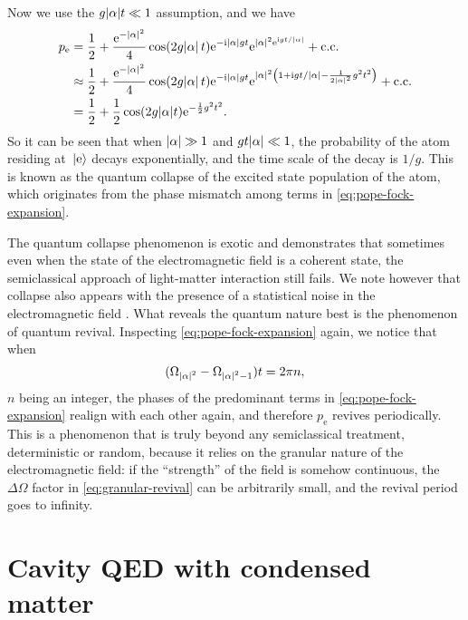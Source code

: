 \documentclass[hyperref, a4paper]{article}
\newcommand*{\ii}{\mathrm{i}}
\newcommand*{\ee}{\mathrm{e}}
\newcommand*{\kete}{\ket*{\text{e}}}
\newcommand*{\pope}{p_{\text{e}}}
\begin{document}
Now we use the $g \abs{\alpha} t \ll 1$ assumption, and we have 
\begin{equation}
    \begin{aligned}
        \pope &= \frac{1}{2} + \frac{\ee^{- \abs*{\alpha}^2}}{4} 
        \cos( 2 g \abs*{\alpha} t) \ee^{- \ii \abs{\alpha} g t} \ee^{\abs{\alpha}^2 \ee^{\ii g t / \abs{\alpha}}} + \text{c.c.} \\
        &\approx  \frac{1}{2} + \frac{\ee^{- \abs*{\alpha}^2}}{4} 
        \cos( 2 g \abs*{\alpha} t) \ee^{- \ii \abs{\alpha} g t} \ee^{\abs{\alpha}^2 \left(1 + \ii g t / \abs{\alpha} - \frac{1}{2 \abs{\alpha}^2} g^2 t^2  \right) } + \text{c.c.} \\
        &= \frac{1}{2} + \frac{1}{2} \cos (2 g \abs{\alpha} t) \ee^{- \frac{1}{2} g^2 t^2}.
    \end{aligned}
\end{equation}
So it can be seen that when $\abs{\alpha} \gg 1$ and $g t \abs{\alpha} \ll 1$,
the probability of the atom residing at $\kete$ decays exponentially,
and the time scale of the decay is $1/g$.
This is known as the quantum collapse of the excited state population of the atom,
which originates from the phase mismatch among terms in \eqref{eq:pope-fock-expansion}.

The quantum collapse phenomenon is exotic and demonstrates that 
sometimes even when the state of the electromagnetic field is a coherent state,
the semiclassical approach of light-matter interaction still fails.
We note however that collapse also appears with the presence 
of a statistical noise in the electromagnetic field \cite{knight1982quantum}.
What reveals the quantum nature best is the phenomenon of quantum revival.
Inspecting \eqref{eq:pope-fock-expansion} again,
we notice that when 
\begin{equation}
    (\Omega_{\abs*{\alpha}^2} - \Omega_{\abs*{\alpha}^2-1}) t = 2\pi n,
    \label{eq:granular-revival}
\end{equation}
$n$ being an integer,
the phases of the predominant terms in \eqref{eq:pope-fock-expansion} realign with each other again,
and therefore $\pope$ revives periodically.
This is a phenomenon that is truly beyond any semiclassical treatment,
deterministic or random,
because it relies on the granular nature of the electromagnetic field:
if the ``strength'' of the field is somehow continuous,
the $\Delta \Omega$ factor in \eqref{eq:granular-revival} can be arbitrarily small,
and the revival period goes to infinity.

\section{Cavity QED with condensed matter}\label{sec:condense}
\end{document}
